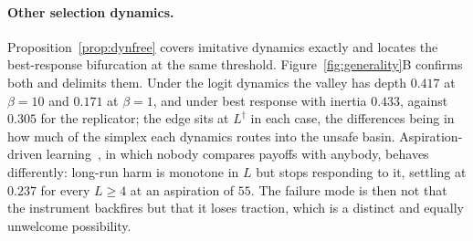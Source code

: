 \documentclass[pdflatex]{sn-jnl}
\theoremstyle{thmstyleone}
\theoremstyle{thmstylethree}
\theoremstyle{thmstyletwo}
\begin{document}
\paragraph{Other selection dynamics.}
Proposition~\ref{prop:dynfree} covers imitative dynamics exactly and locates
the best-response bifurcation at the same threshold.
Figure~\ref{fig:generality}B confirms both and delimits them. Under the logit
dynamics the valley has depth $0.417$ at
$\beta=10$ and $0.171$ at $\beta=1$, and under best response with inertia
$0.433$, against $0.305$ for the replicator; the edge sits at $L^{\dagger}$ in
each case, the differences being in how much of the simplex each dynamics
routes into the unsafe basin. Aspiration-driven learning~\citep{posch1999aspiration}, in which nobody compares payoffs with
anybody, behaves differently: long-run harm is monotone
in $L$ but stops responding to it, settling at $0.237$ for every $L\ge4$ at an
aspiration of $55$. The failure mode is then not that the instrument backfires
but that it loses traction, which is a distinct and equally unwelcome
possibility.
\end{document}
